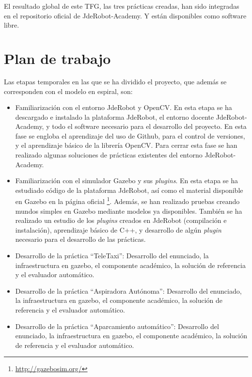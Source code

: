 El resultado global de este TFG, las tres prácticas creadas, han sido integradas en el repositorio oficial de JdeRobot-Academy. Y están disponibles
como software libre.  

\section{Plan de trabajo}
Las etapas temporales en las que se ha dividido el proyecto, que además se corresponden con el modelo en espiral, son:

\begin{itemize}
\item Familiarización con el entorno JdeRobot y OpenCV. En esta etapa se ha descargado e instalado la plataforma JdeRobot, el entorno docente JdeRobot-Academy, y todo el software necesario para el desarrollo del proyecto. En esta fase se engloba el aprendizaje del uso de Github, para el control de versiones, y el aprendizaje básico de la librería OpenCV. Para cerrar esta fase se han realizado algunas soluciones de prácticas existentes del entorno JdeRobot-Academy.
\item Familiarización con el simulador Gazebo y sus \textit{plugins}. En esta etapa se ha estudiado código de la plataforma JdeRobot, así como el material disponible en Gazebo en la página oficial \footnote{\url{http://gazebosim.org/}}.  Además, se han realizado pruebas creando mundos simples en Gazebo mediante modelos ya disponibles. También se ha realizado un estudio de los \textit{plugins} creados en JdeRobot (compilación e instalación), aprendizaje básico de C++, y desarrollo de algún \textit{plugin} necesario para el desarrollo de las prácticas.
\item Desarrollo de la práctica ``TeleTaxi'': Desarrollo del enunciado, la infraestructura en gazebo, el componente académico, la solución de referencia y
el evaluador automático.
\item Desarrollo de la práctica ``Aspiradora Autónoma'': Desarrollo del enunciado, la infraestructura en gazebo, el componente académico, la solución de referencia y el evaluador automático.
\item Desarrollo de la práctica ``Aparcamiento automático'': Desarrollo del enunciado, la infraestructura en gazebo, el componente académico, la solución de referencia y el evaluador automático.
\end{itemize}